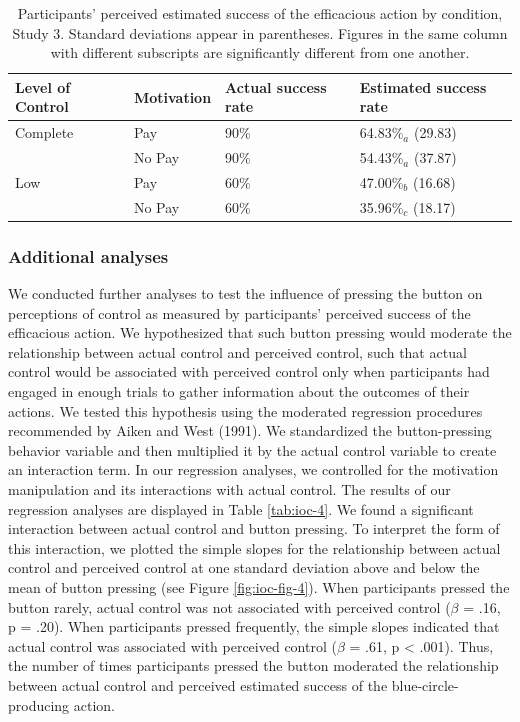 \documentclass[USenglish,letterpaper,12pt,extrafontsizes,oneside,onecolumn,final]{memoir}
\begin{document}
\begin{table} 	
	\setlength{\extrarowheight}{4pt}
	\begin{tabulary}{\linewidth}{lLLL}
	\toprule
	Level of Control & Motivation & Actual success rate & Estimated success rate \\
	\midrule
	Complete      & Pay    & 90\% & 64.83\%$_a$ (29.83) \\ 
	              & No Pay & 90\% & 54.43\%$_a$ (37.87) \\ 
	Low           & Pay    & 60\% & 47.00\%$_b$ (16.68) \\ 
	              & No Pay & 60\% & 35.96\%$_c$ (18.17) \\
	\bottomrule	 	
	\end{tabulary}
	\caption{Participants' perceived estimated success of the efficacious action by condition, Study 3. Standard deviations appear in parentheses. Figures in the same column with different subscripts are significantly different from one another.\label{tab:ioc-3}}
\end{table}

\subsubsection{Additional analyses}
We conducted further analyses to test the influence of pressing the button on perceptions of control as measured by participants' perceived success of the efficacious action. We hypothesized that such button pressing would moderate the relationship between actual control and perceived control, such that actual control would be associated with perceived control only when participants had engaged in enough trials to gather information about the outcomes of their actions. We tested this hypothesis using the moderated regression procedures recommended by Aiken and West (1991). We standardized the button-pressing behavior variable and then multiplied it by the actual control variable to create an interaction term. In our regression analyses, we controlled for the motivation manipulation and its interactions with actual control. The results of our regression analyses are displayed in Table \ref{tab:ioc-4}. We found a significant interaction between actual control and button pressing. To interpret the form of this interaction, we plotted the simple slopes for the relationship between actual control and perceived control at one standard deviation above and below the mean of button pressing (see Figure \ref{fig:ioc-fig-4}). When participants pressed the button rarely, actual control was not associated with perceived control ($\beta$ = .16, p = .20). When participants pressed frequently, the simple slopes indicated that actual control was associated with perceived control ($\beta$ = .61, p < .001). Thus, the number of times participants pressed the button moderated the relationship between actual control and perceived estimated success of the blue-circle-producing action. 
\end{document}
